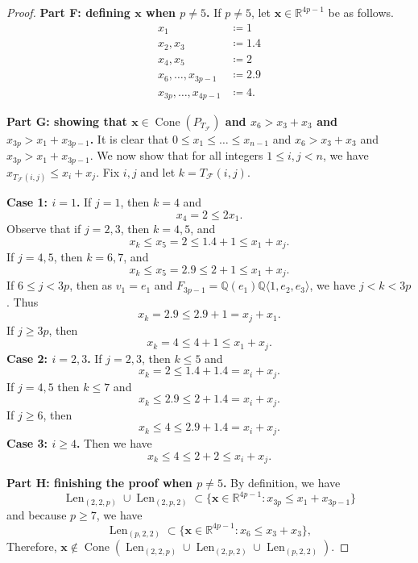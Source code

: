 \documentclass[letterpaper,10pt]{amsart}
\DeclareMathOperator{\Len}{Len}
\DeclareMathOperator{\Cone}{Cone}
\newcommand{\QQ}{\mathbb{Q}}      %
\newcommand{\RR}{\mathbb{R}}      %
\newcommand{\la}{\langle}
\newcommand{\ra}{\rangle}
\newcommand{\cF}{\mathcal{F}}
\theoremstyle{definition}
\theoremstyle{remark}
\begin{document}
\begin{proof}
\noindent \textbf{Part F: defining $\mathbf{x}$ when $p \neq 5$.}
If $p \neq 5$, let $\mathbf{x} \in \RR^{4p-1}$ be as follows.
\begin{align*}
x_1 &\coloneqq 1 \\
x_2, x_3 &\coloneqq 1.4 \\
x_4, x_5 &\coloneqq 2 \\
x_6, \dots, x_{3p-1} &\coloneqq 2.9 \\
x_{3p}, \dots, x_{4p-1} &\coloneqq 4.
\end{align*}

\noindent \textbf{Part G: showing that $\mathbf{x} \in \Cone(P_{T_{\cF}})$ and $x_6 > x_3 + x_3$ and $x_{3p} > x_1 + x_{3p-1}$.}
It is clear that $0\leq x_1 \leq \dots \leq x_{n-1}$ and $x_6 > x_3 + x_3$ and $x_{3p} > x_1 + x_{3p-1}$. We now show that for all integers $1 \leq i,j < n$, we have $x_{T_{\cF}(i,j)} \leq x_i + x_j$. Fix $i,j$ and let $k = T_{\cF}(i,j)$.

\noindent \textbf{Case 1: $i = 1$.}
If $j = 1$, then $k = 4$ and
\[
	x_4 = 2 \leq 2x_1.
\]
Observe that if $j = 2,3$, then $k = 4,5$, and
\[
	x_k \leq x_5 = 2 \leq 1.4 + 1 \leq x_1 + x_j.
\]
If $j = 4,5$, then $k = 6,7$, and
\[
	x_k \leq x_5 = 2.9 \leq 2 + 1 \leq x_1 + x_j.
\]
If $6 \leq j < 3p$, then as $v_1 = e_1$ and $F_{3p-1} = \QQ( e_1 ) \QQ \la 1, e_2, e_3 \ra$, we have $j < k < 3p$. Thus
\[
	x_k = 2.9 \leq 2.9 + 1 = x_j + x_1.
\]
If $j \geq 3p$, then
\[
	x_k = 4 \leq 4 + 1 \leq x_1 + x_j.
\]
\textbf{Case 2: $i = 2,3$.} 
If $j = 2,3$, then $k \leq 5$ and
\[
	x_k = 2 \leq 1.4 + 1.4 = x_i + x_j.
\]
If $j = 4,5$ then $k \leq 7$ and
\[
	x_k \leq 2.9 \leq 2 + 1.4 = x_i + x_j.
\]
If $j \geq 6$, then
\[
	x_k \leq 4 \leq 2.9 + 1.4 = x_i + x_j.
\]
\textbf{Case 3: $i \geq 4$.}
Then we have
\[
	x_k \leq 4 \leq 2 + 2 \leq x_i + x_j.
\]

\noindent \textbf{Part H: finishing the  proof when $p \neq 5$.}
By definition, we have
\[
	\Len_{(2,2,p)} \cup \Len_{(2,p,2)} \subset \{\mathbf{x} \in \RR^{4p-1} : x_{3p} \leq x_1 + x_{3p-1} \}
\]
and because $p \geq 7$, we have
\[
	\Len_{(p,2,2)} \subset \{\mathbf{x} \in \RR^{4p-1} : x_6 \leq x_3 + x_3 \},
\]
Therefore, $\mathbf{x} \notin \Cone(\Len_{(2,2,p)} \cup \Len_{(2,p,2)} \cup \Len_{(p,2,2)})$.
\end{proof}
\end{document}
